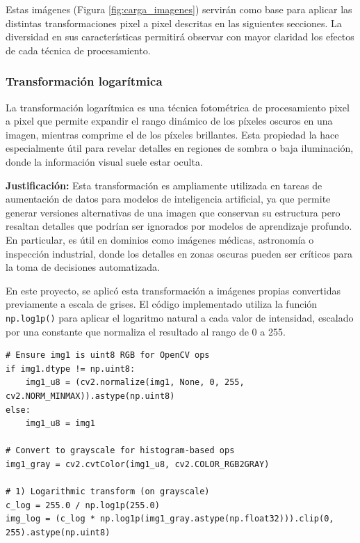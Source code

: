 \documentclass[12pt,letterpaper]{article}
\begin{document}
Estas imágenes (Figura \ref{fig:carga_imagenes}) servirán como base para aplicar las distintas transformaciones pixel a pixel descritas en las siguientes secciones. La diversidad en sus características permitirá observar con mayor claridad los efectos de cada técnica de procesamiento.

\subsubsection{Transformación logarítmica}

La transformación logarítmica es una técnica fotométrica de procesamiento pixel a pixel que permite expandir el rango dinámico de los píxeles oscuros en una imagen, mientras comprime el de los píxeles brillantes. Esta propiedad la hace especialmente útil para revelar detalles en regiones de sombra o baja iluminación, donde la información visual suele estar oculta.

\textbf{Justificación:} Esta transformación es ampliamente utilizada en tareas de aumentación de datos para modelos de inteligencia artificial, ya que permite generar versiones alternativas de una imagen que conservan su estructura pero resaltan detalles que podrían ser ignorados por modelos de aprendizaje profundo. En particular, es útil en dominios como imágenes médicas, astronomía o inspección industrial, donde los detalles en zonas oscuras pueden ser críticos para la toma de decisiones automatizada.

En este proyecto, se aplicó esta transformación a imágenes propias convertidas previamente a escala de grises. El código implementado utiliza la función \texttt{np.log1p()} para aplicar el logaritmo natural a cada valor de intensidad, escalado por una constante que normaliza el resultado al rango de 0 a 255.

\begin{verbatim}
# Ensure img1 is uint8 RGB for OpenCV ops
if img1.dtype != np.uint8:
    img1_u8 = (cv2.normalize(img1, None, 0, 255, cv2.NORM_MINMAX)).astype(np.uint8)
else:
    img1_u8 = img1

# Convert to grayscale for histogram-based ops
img1_gray = cv2.cvtColor(img1_u8, cv2.COLOR_RGB2GRAY)

# 1) Logarithmic transform (on grayscale)
c_log = 255.0 / np.log1p(255.0)
img_log = (c_log * np.log1p(img1_gray.astype(np.float32))).clip(0, 255).astype(np.uint8)
\end{verbatim}
\end{document}
